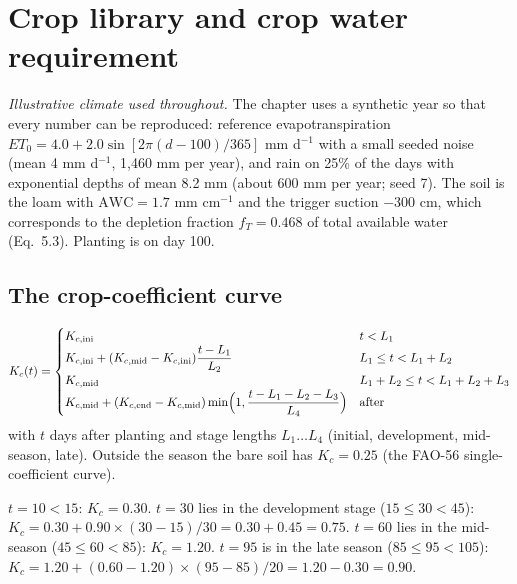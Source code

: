 \chapter{Crop library and crop water requirement}\label{ch:crops}

\textit{Illustrative climate used throughout.} The chapter uses a synthetic year so that every number can be reproduced: reference evapotranspiration $ET_0=4.0+2.0\sin[2\pi(d-100)/365]$ mm d$^{-1}$ with a small seeded noise (mean 4 mm d$^{-1}$, 1,460 mm per year), and rain on 25\% of the days with exponential depths of mean 8.2 mm (about 600 mm per year; seed 7). The soil is the loam with $\mathrm{AWC}=1.7$ mm cm$^{-1}$ and the trigger suction $-300$ cm, which corresponds to the depletion fraction $f_T=0.468$ of total available water (Eq.~5.3). Planting is on day 100.

\section{The crop-coefficient curve}
\begin{equation}K_c(t)=\begin{cases}K_{c,\rm ini}&t<L_1\\K_{c,\rm ini}+(K_{c,\rm mid}-K_{c,\rm ini})\dfrac{t-L_1}{L_2}&L_1\le t<L_1+L_2\\K_{c,\rm mid}&L_1+L_2\le t<L_1+L_2+L_3\\K_{c,\rm mid}+(K_{c,\rm end}-K_{c,\rm mid})\min\!\Big(1,\dfrac{t-L_1-L_2-L_3}{L_4}\Big)&\text{after}\end{cases}\end{equation}
with $t$ days after planting and stage lengths $L_1\ldots L_4$ (initial, development, mid-season, late). Outside the season the bare soil has $K_c=0.25$ (the FAO-56 single-coefficient curve).

\sol  $t=10<15$: $K_c=0.30$. $t=30$ lies in the development stage ($15\le30<45$): $K_c=0.30+0.90\times(30-15)/30=0.30+0.45=0.75$. $t=60$ lies in the mid-season ($45\le60<85$): $K_c=1.20$. $t=95$ is in the late season ($85\le95<105$): $K_c=1.20+(0.60-1.20)\times(95-85)/20=1.20-0.30=0.90$.


